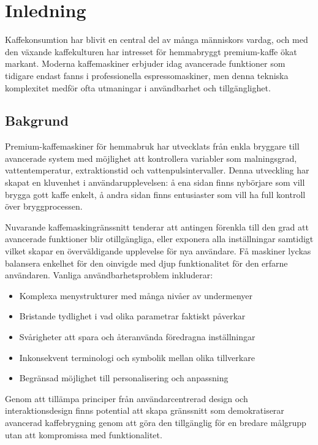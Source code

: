 \section{Inledning}

Kaffekonsumtion har blivit en central del av många människors vardag, och med den växande kaffekulturen har intresset för hemmabryggt premium-kaffe ökat markant. Moderna kaffemaskiner erbjuder idag avancerade funktioner som tidigare endast fanns i professionella espressomaskiner, men denna tekniska komplexitet medför ofta utmaningar i användbarhet och tillgänglighet.

\subsection{Bakgrund}

Premium-kaffemaskiner för hemmabruk har utvecklats från enkla bryggare till avancerade system med möjlighet att kontrollera variabler som malningsgrad, vattentemperatur, extraktionstid och vattenpulsintervaller. Denna utveckling har skapat en kluvenhet i användarupplevelsen: å ena sidan finns nybörjare som vill brygga gott kaffe enkelt, å andra sidan finns entusiaster som vill ha full kontroll över bryggprocessen.

Nuvarande kaffemaskingränssnitt tenderar att antingen förenkla till den grad att avancerade funktioner blir otillgängliga, eller exponera alla inställningar samtidigt vilket skapar en överväldigande upplevelse för nya användare. Få maskiner lyckas balansera enkelhet för den oinvigde med djup funktionalitet för den erfarne användaren. Vanliga användbarhetsproblem inkluderar:

\begin{itemize}
    \item Komplexa menystrukturer med många nivåer av undermenyer
    \item Bristande tydlighet i vad olika parametrar faktiskt påverkar
    \item Svårigheter att spara och återanvända föredragna inställningar
    \item Inkonsekvent terminologi och symbolik mellan olika tillverkare
    \item Begränsad möjlighet till personalisering och anpassning
\end{itemize}

Genom att tillämpa principer från användarcentrerad design och interaktionsdesign finns potential att skapa gränssnitt som demokratiserar avancerad kaffebrygning genom att göra den tillgänglig för en bredare målgrupp utan att kompromissa med funktionalitet.


